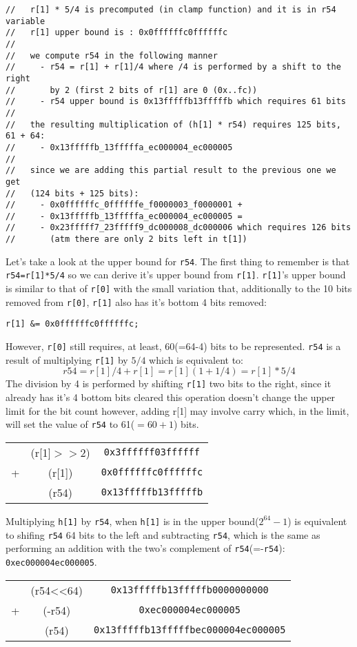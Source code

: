 \documentclass{article}
\begin{document}
\begin{Verbatim}[fontsize=\footnotesize]
//   r[1] * 5/4 is precomputed (in clamp function) and it is in r54 variable
//   r[1] upper bound is : 0x0ffffffc0ffffffc
//
//   we compute r54 in the following manner
//     - r54 = r[1] + r[1]/4 where /4 is performed by a shift to the right
//       by 2 (first 2 bits of r[1] are 0 (0x..fc))
//     - r54 upper bound is 0x13fffffb13fffffb which requires 61 bits
//
//   the resulting multiplication of (h[1] * r54) requires 125 bits, 61 + 64:
//     - 0x13fffffb_13fffffa_ec000004_ec000005
//
//   since we are adding this partial result to the previous one we get
//   (124 bits + 125 bits):
//     - 0x0ffffffc_0ffffffe_f0000003_f0000001 + 
//     - 0x13fffffb_13fffffa_ec000004_ec000005 =
//     - 0x23fffff7_23fffff9_dc000008_dc000006 which requires 126 bits
//       (atm there are only 2 bits left in t[1])
\end{Verbatim}
Let's take a look at the upper bound for \texttt{r54}. The first thing to remember is that \texttt{r54=r[1]*5/4} so we can derive it's upper bound from 
\texttt{r[1]}. \texttt{r[1]}'s upper bound is similar to that of \texttt{r[0]} with the small variation that, additionally to the 10 bits removed from
\texttt{r[0]}, \texttt{r[1]} also has it's bottom 4 bits removed:
\begin{Verbatim}[fontsize=\footnotesize]
r[1] &= 0x0ffffffc0ffffffc;
\end{Verbatim}
However, \texttt{r[0]} still requires, at least, 60(=64-4) bits to be represented. 
\texttt{r54} is a result of multiplying \texttt{r[1]} by $5/4$ which is equivalent to:
$$r54 = r[1]/4 + r[1] = r[1](1+1/4) = r[1]*5/4 $$
The division by 4 is performed by shifting \texttt{r[1]} two bits to the right, since it already has it's 4 bottom bits cleared this operation doesn't change
the upper limit for the bit count however, adding r[1] may involve carry which, in the limit, will set the value of \texttt{r54} to 61($=60+1$) bits.

\begin{tabular}{c c c}
    &  (r[1]$>>$2)  &\texttt{0x3ffffff03ffffff} \\
+   &  (r[1])       &\texttt{0x0ffffffc0ffffffc} \\
\hline
    & (r54)         &\texttt{0x13fffffb13fffffb} \\
\end{tabular}

Multiplying \texttt{h[1]} by \texttt{r54}, when \texttt{h[1]} is in the upper bound($2^{64}-1$) is equivalent to shifing \texttt{r54} 64 bits to the left and 
subtracting \texttt{r54}, which is the same as performing an addition with the two's complement of \texttt{r54}(=-\texttt{r54}): \texttt{0xec000004ec000005}.
\begin{tabular}{c c c}
    &  (r54<<64)    &\texttt{0x13fffffb13fffffb0000000000} \\
+   &  (-r54)       &\texttt{0xec000004ec000005} \\
\hline
    & (r54)         &\texttt{0x13fffffb13fffffbec000004ec000005} \\
\end{tabular}
\end{document}

